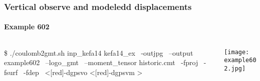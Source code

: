\begin{frame}[t,fragile]
  \frametitle{Vertical observe and modeledd displacements}
  \framesubtitle{Example 602}
  \label{ch5fr:ex602}
\begin{columns}[t]
  \begin{column}{.5\textwidth}
\begin{scriptsize}
\begin{verbnobox}[\vbdelim]
\$ ./coulomb2gmt.sh inp_kefa14 kefa14_ex \
                   -outjpg \ 
                   --output example602 \
                   --logo_gmt \
                   --moment_tensor historic.cmt \
                   -fproj \
                   -fsurf \
                   -fdep \
                   <[red]-dgpsvo \>
                   <[red]-dgpsvm >
\end{verbnobox}
\end{scriptsize}

  \end{column}
  \begin{column}{.5\textwidth}

\centering
  \texttt{[image: example602.jpg]}
  \end{column}
\end{columns}

\end{frame}
\note{}
